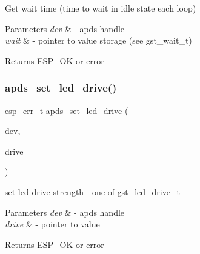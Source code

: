\begin{DoxyItemize}
\item Get wait time (time to wait in idle state each loop) 
\end{DoxyItemize}


\begin{DoxyParams}{Parameters}
{\em dev} & -\/ apds handle \\
\hline
{\em wait} & -\/ pointer to value storage (see gst\+\_\+wait\+\_\+t) \\
\hline
\end{DoxyParams}
\begin{DoxyReturn}{Returns}
E\+S\+P\+\_\+\+OK or error 
\end{DoxyReturn}
\mbox{\label{group__APDS9960__GeneralFunctions_gac4250216ba09d463b8dba7d2231660e5}} 
\subsubsection{\texorpdfstring{apds\+\_\+set\+\_\+led\+\_\+drive()}{apds\_set\_led\_drive()}}
{\footnotesize\ttfamily esp\+\_\+err\+\_\+t apds\+\_\+set\+\_\+led\+\_\+drive (\begin{DoxyParamCaption}\item[{\hyperlink{structAPDS9960__Driver}{A\+P\+D\+S\+\_\+\+D\+EV}}]{dev,  }\item[{apds\+\_\+led\+\_\+drive\+\_\+t $\ast$}]{drive }\end{DoxyParamCaption})}




\begin{DoxyItemize}
\item set led drive strength -\/ one of gst\+\_\+led\+\_\+drive\+\_\+t 
\end{DoxyItemize}


\begin{DoxyParams}{Parameters}
{\em dev} & -\/ apds handle \\
\hline
{\em drive} & -\/ pointer to value \\
\hline
\end{DoxyParams}
\begin{DoxyReturn}{Returns}
E\+S\+P\+\_\+\+OK or error 
\end{DoxyReturn}
\mbox{\label{group__APDS9960__GeneralFunctions_ga70a986a664b7d7fa0d22a5df25b92950}} 
